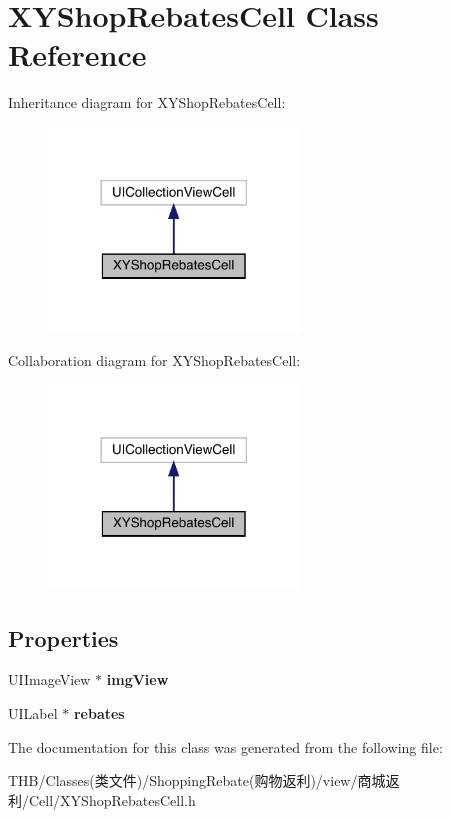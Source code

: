 \hypertarget{interface_x_y_shop_rebates_cell}{}\section{X\+Y\+Shop\+Rebates\+Cell Class Reference}
\label{interface_x_y_shop_rebates_cell}


Inheritance diagram for X\+Y\+Shop\+Rebates\+Cell\+:\nopagebreak
\begin{figure}[H]
\begin{center}
\leavevmode
\includegraphics[width=189pt]{interface_x_y_shop_rebates_cell__inherit__graph}
\end{center}
\end{figure}


Collaboration diagram for X\+Y\+Shop\+Rebates\+Cell\+:\nopagebreak
\begin{figure}[H]
\begin{center}
\leavevmode
\includegraphics[width=189pt]{interface_x_y_shop_rebates_cell__coll__graph}
\end{center}
\end{figure}
\subsection*{Properties}
\begin{DoxyCompactItemize}
\item 
\mbox{\label{interface_x_y_shop_rebates_cell_ae87d52ee5fdacaaff2bc6b5fbb1b698b}} 
U\+I\+Image\+View $\ast$ {\bfseries img\+View}
\item 
\mbox{\label{interface_x_y_shop_rebates_cell_ae9e186d1d2affb2145d755e109327a89}} 
U\+I\+Label $\ast$ {\bfseries rebates}
\end{DoxyCompactItemize}


The documentation for this class was generated from the following file\+:\begin{DoxyCompactItemize}
\item 
T\+H\+B/\+Classes(类文件)/\+Shopping\+Rebate(购物返利)/view/商城返利/\+Cell/X\+Y\+Shop\+Rebates\+Cell.\+h\end{DoxyCompactItemize}
